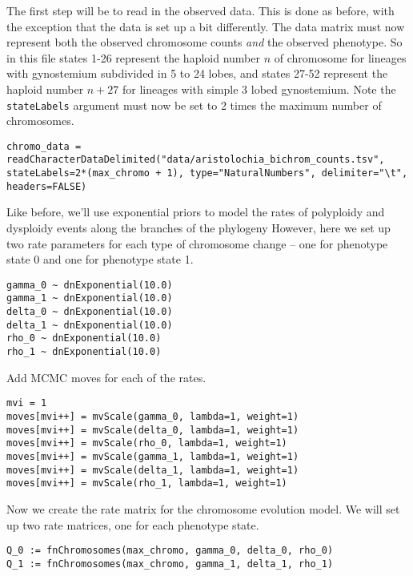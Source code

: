 The first step will be to read in the observed data. This is done as before,
with the exception that the data is set up a bit differently. The data matrix
must now represent both the observed chromosome counts \textit{and} the observed
phenotype. So in this file states 1-26 represent the haploid number $n$ of chromosome for lineages 
with gynostemium subdivided in 5 to 24 lobes, and states 27-52 represent the haploid number $n + 27$
for lineages with simple 3 lobed gynostemium.
Note the \texttt{stateLabels} argument must now be set to 2 times the maximum number of chromosomes.
{\tt \begin{snugshade*}
\begin{lstlisting}
chromo_data = readCharacterDataDelimited("data/aristolochia_bichrom_counts.tsv", stateLabels=2*(max_chromo + 1), type="NaturalNumbers", delimiter="\t", headers=FALSE)
\end{lstlisting}
\end{snugshade*}}
Like before, we'll use exponential priors to model the rates of polyploidy and 
dysploidy events along the branches of the phylogeny
However, here we set up two rate parameters for each type of chromosome change --
one for phenotype state 0 and one for phenotype state 1.
{\tt \begin{snugshade*}
\begin{lstlisting}
gamma_0 ~ dnExponential(10.0)
gamma_1 ~ dnExponential(10.0)
delta_0 ~ dnExponential(10.0)
delta_1 ~ dnExponential(10.0)
rho_0 ~ dnExponential(10.0)
rho_1 ~ dnExponential(10.0)
\end{lstlisting}
\end{snugshade*}}
Add MCMC moves for each of the rates.
{\tt \begin{snugshade*}
\begin{lstlisting}
mvi = 1
moves[mvi++] = mvScale(gamma_0, lambda=1, weight=1)
moves[mvi++] = mvScale(delta_0, lambda=1, weight=1)
moves[mvi++] = mvScale(rho_0, lambda=1, weight=1)
moves[mvi++] = mvScale(gamma_1, lambda=1, weight=1)
moves[mvi++] = mvScale(delta_1, lambda=1, weight=1)
moves[mvi++] = mvScale(rho_1, lambda=1, weight=1)
\end{lstlisting}
\end{snugshade*}}
Now we create the rate matrix for the chromosome evolution model.
We will set up two rate matrices, one for each phenotype state.
{\tt \begin{snugshade*}
\begin{lstlisting}
Q_0 := fnChromosomes(max_chromo, gamma_0, delta_0, rho_0)
Q_1 := fnChromosomes(max_chromo, gamma_1, delta_1, rho_1)
\end{lstlisting}
\end{snugshade*}}
